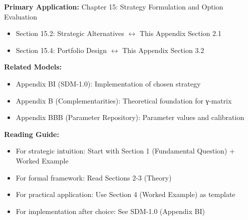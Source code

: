 %
%



\begin{tcolorbox}[colback=purple!5!white, colframe=purple!75!black,
    title=Chapter Linkage: Strategic Option Comparison]

\textbf{Primary Application:} Chapter 15: Strategy Formulation and Option Evaluation
\begin{itemize}[nosep]
\item Section 15.2: Strategic Alternatives $\leftrightarrow$ This Appendix Section 2.1
\item Section 15.4: Portfolio Design $\leftrightarrow$ This Appendix Section 3.2
\end{itemize}

\textbf{Related Models:}
\begin{itemize}[nosep]
\item Appendix BI (SDM-1.0): Implementation of chosen strategy
\item Appendix B (Complementarities): Theoretical foundation for γ-matrix
\item Appendix BBB (Parameter Repository): Parameter values and calibration
\end{itemize}

\textbf{Reading Guide:}
\begin{itemize}[nosep]
\item For strategic intuition: Start with Section 1 (Fundamental Question) + Worked Example
\item For formal framework: Read Sections 2-3 (Theory)
\item For practical application: Use Section 4 (Worked Example) as template
\item For implementation after choice: See SDM-1.0 (Appendix BI)
\end{itemize}

\end{tcolorbox}

